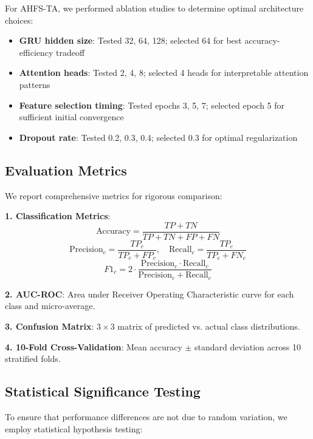 \documentclass[journal]{IEEEtran}
\begin{document}
For AHFS-TA, we performed ablation studies to determine optimal architecture choices:
\begin{itemize}
\item \textbf{GRU hidden size}: Tested 32, 64, 128; selected 64 for best accuracy-efficiency tradeoff
\item \textbf{Attention heads}: Tested 2, 4, 8; selected 4 heads for interpretable attention patterns
\item \textbf{Feature selection timing}: Tested epochs 3, 5, 7; selected epoch 5 for sufficient initial convergence
\item \textbf{Dropout rate}: Tested 0.2, 0.3, 0.4; selected 0.3 for optimal regularization
\end{itemize}

\subsection{Evaluation Metrics}

We report comprehensive metrics for rigorous comparison:

\textbf{1. Classification Metrics}:
\begin{equation}
\text{Accuracy} = \frac{TP + TN}{TP + TN + FP + FN}
\end{equation}
\begin{equation}
\text{Precision}_c = \frac{TP_c}{TP_c + FP_c}, \quad \text{Recall}_c = \frac{TP_c}{TP_c + FN_c}
\end{equation}
\begin{equation}
F1_c = 2 \cdot \frac{\text{Precision}_c \cdot \text{Recall}_c}{\text{Precision}_c + \text{Recall}_c}
\end{equation}

\textbf{2. AUC-ROC}: Area under Receiver Operating Characteristic curve for each class and micro-average.

\textbf{3. Confusion Matrix}: $3 \times 3$ matrix of predicted vs. actual class distributions.

\textbf{4. 10-Fold Cross-Validation}: Mean accuracy $\pm$ standard deviation across 10 stratified folds.

\subsection{Statistical Significance Testing}

To ensure that performance differences are not due to random variation, we employ statistical hypothesis testing:
\end{document}
